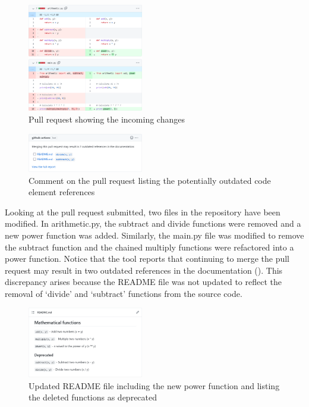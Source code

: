 \documentclass[conference]{IEEEtran}
\begin{document}
\begin{figure}[htbp]
    \centering
    \includegraphics[width=0.45\textwidth]{tool_pr.png}
    \caption{Pull request showing the incoming changes}
    \label{fig:tool_pr}
\end{figure}

\begin{figure}[htbp]
    \centering
    \includegraphics[width=0.45\textwidth]{tool_message.png}
    \caption{Comment on the pull request listing the potentially outdated code element references}
    \label{fig:tool_message}
\end{figure}

Looking at the pull request submitted, two files in the repository have been modified. In arithmetic.py, the subtract and divide functions were removed and a new power function was added. Similarly, the main.py file was modified to remove the subtract function and the chained multiply functions were refactored into a power function. Notice that the tool reports that continuing to merge the pull request may result in two outdated references in the documentation (). This discrepancy arises because the README file was not updated to reflect the removal of `divide' and `subtract' functions from the source code.

\begin{figure}[htbp]
    \centering
    \includegraphics[width=0.45\textwidth]{tool_doc_updated.png}
    \caption{Updated README file including the new power function and listing the deleted functions as deprecated}
    \label{fig:tool_doc_updated}
\end{figure}
\end{document}
